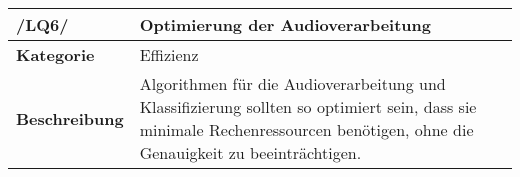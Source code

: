 \begin{table}[h!]
	\begin{tabularx}{\textwidth}{|l|X|}
		\hline
		\textbf{/LQ6/} & \textbf{Optimierung der Audioverarbeitung} \\ \hline
		\textbf{Kategorie} & Effizienz \\ \hline
		\textbf{Beschreibung} & Algorithmen für die Audioverarbeitung und Klassifizierung sollten so optimiert sein, dass sie minimale Rechenressourcen benötigen, ohne die Genauigkeit zu beeinträchtigen. \\ \hline
	\end{tabularx}
\end{table}